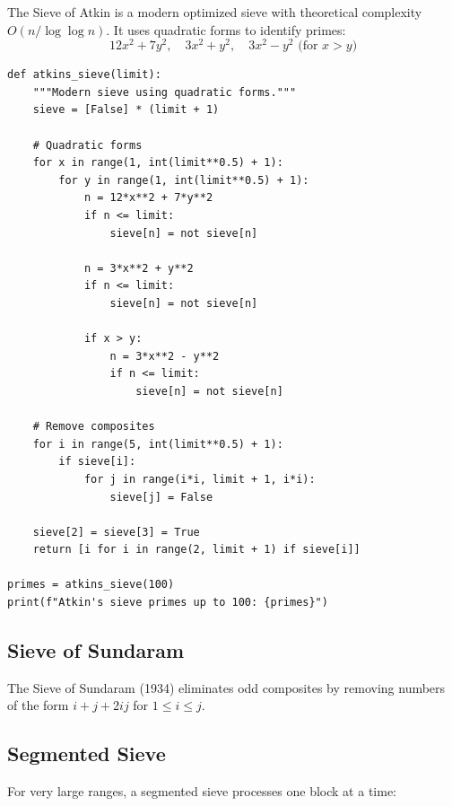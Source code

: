 The Sieve of Atkin is a modern optimized sieve with theoretical complexity
$O(n / \log \log n)$. It uses quadratic forms to identify primes:
\[
12x^2 + 7y^2, \quad 3x^2 + y^2, \quad 3x^2 - y^2 \text{ (for } x > y)
\]

\begin{lstlisting}[caption={Atkin's sieve}, label=lst:atkens_sieve]
def atkins_sieve(limit):
    """Modern sieve using quadratic forms."""
    sieve = [False] * (limit + 1)
    
    # Quadratic forms
    for x in range(1, int(limit**0.5) + 1):
        for y in range(1, int(limit**0.5) + 1):
            n = 12*x**2 + 7*y**2
            if n <= limit:
                sieve[n] = not sieve[n]
            
            n = 3*x**2 + y**2
            if n <= limit:
                sieve[n] = not sieve[n]
            
            if x > y:
                n = 3*x**2 - y**2
                if n <= limit:
                    sieve[n] = not sieve[n]
    
    # Remove composites
    for i in range(5, int(limit**0.5) + 1):
        if sieve[i]:
            for j in range(i*i, limit + 1, i*i):
                sieve[j] = False
    
    sieve[2] = sieve[3] = True
    return [i for i in range(2, limit + 1) if sieve[i]]

primes = atkins_sieve(100)
print(f"Atkin's sieve primes up to 100: {primes}")
\end{lstlisting}

\subsection{Sieve of Sundaram}

The Sieve of Sundaram (1934) eliminates odd composites by removing numbers
of the form $i + j + 2ij$ for $1 \le i \le j$.

\subsection{Segmented Sieve}

For very large ranges, a segmented sieve processes one block at a time:

